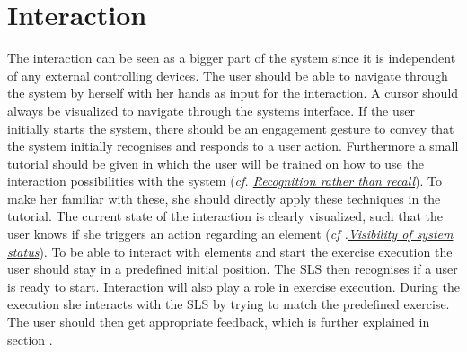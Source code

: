 \section{Interaction}\label{4_2_interaction}
The interaction can be seen as a bigger part of the system since it is independent of any external controlling devices. The user should be able to navigate through the system by herself with her hands as input for the interaction. A cursor should always be visualized to navigate through the systems interface. If the user initially starts the system, there should be an engagement gesture to convey that the system initially recognises and responds to a user action. Furthermore a small tutorial should be given in which the user will be trained on how to use the interaction possibilities with the system (\textit{cf. \hyperref[nielsenDesignPrinciples]{Recognition rather than recall}}). To make her familiar with these, she should directly apply these techniques in the tutorial. The current state of the interaction is clearly visualized, such that the user knows if she triggers an action regarding an element (\textit{cf .\hyperref[nielsenDesignPrinciples]{Visibility of system status}}). To be able to interact with elements and start the exercise execution the user should stay in a predefined initial position. The SLS then recognises if a user is ready to start. Interaction will also play a role in exercise execution. During the execution she interacts with the SLS by trying to match the predefined exercise. The user should then get appropriate feedback, which is further explained in section \textit{}.

\begin{comment}
- user can and should interact with the system
\\- Cursor visualization as hand image
\\- Engagement gesture for first interaction with Kinect (One hand over shoulder)
\\- She should be instructed how to interact 
\\- Different interaction methods should be provided to prevent failing on one (tutorial --> clicking (variations) + scrolling)
\end{comment}